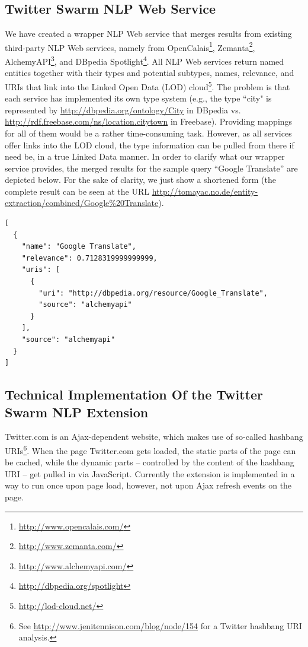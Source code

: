 \documentclass[runningheads,a4paper]{llncs}
\begin{document}

\subsection{Twitter Swarm NLP Web Service}\label{sec:webservice}
We have created a wrapper NLP Web service that merges results from existing third-party NLP Web services, namely from OpenCalais\footnote{\url{http://www.opencalais.com/}}, Zemanta\footnote{\url{http://www.zemanta.com/}}, AlchemyAPI\footnote{\url{http://www.alchemyapi.com/}}, and DBpedia Spotlight\footnote{\url{http://dbpedia.org/spotlight}}. All NLP Web services return named entities together with their types and potential subtypes, names, relevance, and URIs that link into the Linked Open Data (LOD) cloud\footnote{\url{http://lod-cloud.net/}}. The problem is that each service has implemented its own type system (e.g., the type ``city" is represented by \url{http://dbpedia.org/ontology/City} in DBpedia vs. \url{http://rdf.freebase.com/ns/location.citytown} in Freebase). Providing mappings for all of them would be a rather time-consuming task. However, as all services offer links into the LOD cloud, the type information can be pulled from there if need be, in a true Linked Data manner. In order to clarify what our wrapper service provides, the merged results for the sample query ``Google Translate'' are depicted below. For the sake of clarity, we just show a shortened form (the complete result can be seen at the URL \url{http://tomayac.no.de/entity-extraction/combined/Google%20Translate}).

\begin{lstlisting}
[
  {
    "name": "Google Translate",
    "relevance": 0.7128319999999999,
    "uris": [
      {
        "uri": "http://dbpedia.org/resource/Google_Translate",
        "source": "alchemyapi"
      }
    ],
    "source": "alchemyapi"
  }
]
\end{lstlisting}

\subsection{Technical Implementation Of the Twitter Swarm NLP Extension}\label{sec:techimp}
Twitter.com is an Ajax-dependent website, which makes use of so-called hashbang URIs\footnote{See \url{http://www.jenitennison.com/blog/node/154} for a Twitter hashbang URI analysis.}. When the page Twitter.com gets loaded, the static parts of the page can be cached, while the dynamic parts -- controlled by the content of the hashbang URI -- get pulled in via JavaScript. Currently the extension is implemented in a way to run once upon page load, however, not upon Ajax refresh events on the page.
\end{document}
